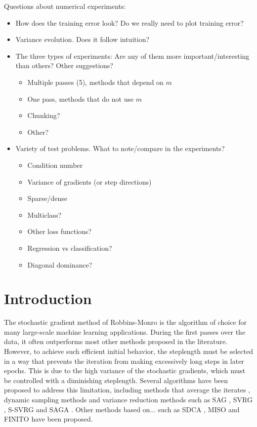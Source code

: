 \documentclass[11pt]{article}
\begin{document}
Questions about numerical experiments:
\begin{itemize}
	\item How does the training error look? Do we really need to plot training error?
	\item Variance evolution. Does it follow intuition?
	\item The three types of experiments: Are any of them more important/interesting than others? Other suggestions?
	      \begin{itemize}
	      	\item Multiple passes (5), methods that depend on $m$
	      	\item One pass, methods that do not use $m$
	      	\item Chunking?
	      	\item Other?
	      \end{itemize}
	\item Variety of test problems. What to note/compare in the experiments?
	\begin{itemize}
		\item Condition number
		\item Variance of gradients (or step directions)
		\item Sparse/dense
		\item Multiclass?
		\item Other loss functions?
		\item Regression vs classification?
		\item Diagonal dominance?
	\end{itemize}
\end{itemize}




\section{Introduction}

The stochastic gradient method of Robbins-Monro \cite{RobMon51} is the algorithm of choice for many large-scale machine learning applications. During the first passes over the data, it often outperforms most other methods proposed in the literature. However, to achieve such efficient initial behavior, the steplength  must be selected in a way that prevents the iteration from making excessively long steps in later epochs. This is due to the high variance of the stochastic gradients, which must be controlled with a diminishing steplength. Several algorithms have been proposed to address this limitation, including methods that average the iterates \cite{polyak,ruppert1988efficient}, dynamic sampling methods \cite{dss,FS2011,2014pasglyetal} and variance reduction methods such as SAG \cite{roux2012stochastic}, SVRG \cite{johnson2013accelerating}, S-SVRG \cite{s-svrg} and SAGA \cite{NIPS2014_5258}. Other methods based on... such as SDCA \cite{}, MISO and FINITO \cite{} have been proposed.
\end{document}
